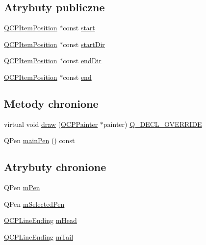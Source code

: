 \subsection*{Atrybuty publiczne}
\begin{DoxyCompactItemize}
\item 
\hyperlink{class_q_c_p_item_position}{Q\+C\+P\+Item\+Position} $\ast$const \hyperlink{class_q_c_p_item_curve_a20c3b5ea31c33764f4f30c2ec7ae518b}{start}
\item 
\hyperlink{class_q_c_p_item_position}{Q\+C\+P\+Item\+Position} $\ast$const \hyperlink{class_q_c_p_item_curve_aa124bf66c09cc51c627fb49db8bf8a7b}{start\+Dir}
\item 
\hyperlink{class_q_c_p_item_position}{Q\+C\+P\+Item\+Position} $\ast$const \hyperlink{class_q_c_p_item_curve_a28181a9dee9cc3c3da83a883221bd2d0}{end\+Dir}
\item 
\hyperlink{class_q_c_p_item_position}{Q\+C\+P\+Item\+Position} $\ast$const \hyperlink{class_q_c_p_item_curve_a24ecbb195b32a08b42b61c2cf08a1b4d}{end}
\end{DoxyCompactItemize}
\subsection*{Metody chronione}
\begin{DoxyCompactItemize}
\item 
virtual void \hyperlink{class_q_c_p_item_curve_a856ae61de18278847ba5e0e357bf68f2}{draw} (\hyperlink{class_q_c_p_painter}{Q\+C\+P\+Painter} $\ast$painter) \hyperlink{qcustomplot_8hh_a42cc5eaeb25b85f8b52d2a4b94c56f55}{Q\+\_\+\+D\+E\+C\+L\+\_\+\+O\+V\+E\+R\+R\+I\+DE}
\item 
Q\+Pen \hyperlink{class_q_c_p_item_curve_a8089126f5645b6edfbaddea49d1e8390}{main\+Pen} () const 
\end{DoxyCompactItemize}
\subsection*{Atrybuty chronione}
\begin{DoxyCompactItemize}
\item 
Q\+Pen \hyperlink{class_q_c_p_item_curve_a7ef92988d1db2e4d0311e34c0a57fe42}{m\+Pen}
\item 
Q\+Pen \hyperlink{class_q_c_p_item_curve_ab22cbab261b20be5aa8e4ca252149246}{m\+Selected\+Pen}
\item 
\hyperlink{class_q_c_p_line_ending}{Q\+C\+P\+Line\+Ending} \hyperlink{class_q_c_p_item_curve_af2cc26ff199570940dc96f5ec19a13f8}{m\+Head}
\item 
\hyperlink{class_q_c_p_line_ending}{Q\+C\+P\+Line\+Ending} \hyperlink{class_q_c_p_item_curve_af1dca285b97e3f5b892dab827a79f327}{m\+Tail}
\end{DoxyCompactItemize}
